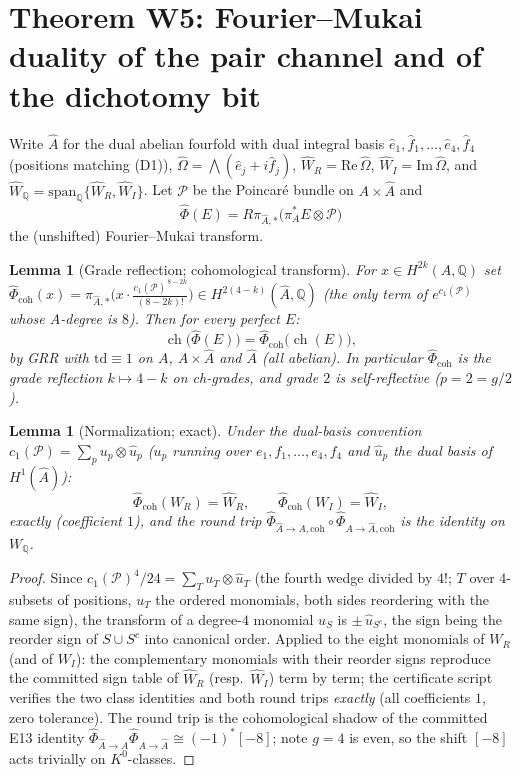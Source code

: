 \documentclass[11pt]{article}
\newtheorem{lemma}[theorem]{Lemma}
\theoremstyle{definition}
\newcommand{\ch}{\operatorname{ch}}
\newcommand{\Q}{\mathbb{Q}}
\newcommand{\WQ}{W_{\Q}}
\newcommand{\FMc}{\widehat\Phi}
\begin{document}
\section{Theorem W5: Fourier--Mukai duality of the pair channel and of the dichotomy bit}\label{sec:w5}

Write $\widehat A$ for the dual abelian fourfold with dual integral basis
$\hat e_1,\hat f_1,\dots,\hat e_4,\hat f_4$ (positions matching (D1)),
$\widehat\Omega=\bigwedge(\hat e_j+i\hat f_j)$,
$\widehat W_R=\mathrm{Re}\,\widehat\Omega$,
$\widehat W_I=\mathrm{Im}\,\widehat\Omega$, and
$\widehat\WQ=\mathrm{span}_\Q\{\widehat W_R,\widehat W_I\}$.
Let $\mathcal P$ be the Poincar\'e bundle on $A\times\widehat A$ and
\[
\FMc(E)=R\pi_{\widehat A,*}\bigl(\pi_A^*E\otimes\mathcal P\bigr)
\]
the (unshifted) Fourier--Mukai transform.

\begin{lemma}[Grade reflection; cohomological transform]\label{lem:graderef}
For $x\in H^{2k}(A,\Q)$ set
$\FMc_{\mathrm{coh}}(x)=\pi_{\widehat A,*}\bigl(x\cdot
\tfrac{c_1(\mathcal P)^{\,8-2k}}{(8-2k)!}\bigr)\in H^{2(4-k)}(\widehat A,\Q)$
(the only term of $e^{c_1(\mathcal P)}$ whose $A$-degree is $8$).
Then for every perfect $E$:
\[
\ch\bigl(\FMc(E)\bigr)=\FMc_{\mathrm{coh}}\bigl(\ch(E)\bigr),
\]
by GRR with $\mathrm{td}\equiv 1$ on $A$, $A\times\widehat A$ and
$\widehat A$ (all abelian). In particular $\FMc_{\mathrm{coh}}$ is the
\emph{grade reflection} $k\mapsto 4-k$ on ch-grades, and grade $2$ is
self-reflective ($p=2=g/2$).
\end{lemma}

\begin{lemma}[Normalization; exact]\label{lem:norm}
Under the dual-basis convention
$c_1(\mathcal P)=\sum_{p}u_p\otimes\hat u_p$ ($u_p$ running over
$e_1,f_1,\dots,e_4,f_4$ and $\hat u_p$ the dual basis of $H^1(\widehat A)$):
\[
\FMc_{\mathrm{coh}}(W_R)=\widehat W_R,\qquad
\FMc_{\mathrm{coh}}(W_I)=\widehat W_I,
\]
\emph{exactly} (coefficient $1$), and the round trip
$\FMc_{\widehat A\to A,\mathrm{coh}}\circ\FMc_{A\to\widehat A,\mathrm{coh}}$
is the identity on $\WQ$.
\end{lemma}

\begin{proof}
Since $c_1(\mathcal P)^4/24=\sum_T u_T\otimes\hat u_T$ (the fourth wedge
divided by $4!$; $T$ over $4$-subsets of positions, $u_T$ the ordered
monomials, both sides reordering with the same sign), the transform of a
degree-$4$ monomial $u_S$ is $\pm\,\hat u_{S^c}$, the sign being the reorder
sign of $S\cup S^c$ into canonical order. Applied to the eight monomials of
$W_R$ (and of $W_I$): the complementary monomials with their reorder signs
reproduce the committed sign table of $\widehat W_R$ (resp.\
$\widehat W_I$) term by term; the certificate script verifies the two class
identities and both round trips \emph{exactly} (all coefficients $1$,
zero tolerance). The round trip is the cohomological shadow of the committed
E13 identity $\FMc_{\widehat A\to A}\FMc_{A\to\widehat A}\cong(-1)^*[-8]$;
note $g=4$ is even, so the shift $[-8]$ acts trivially on $K^0$-classes.
\end{proof}
\end{document}
